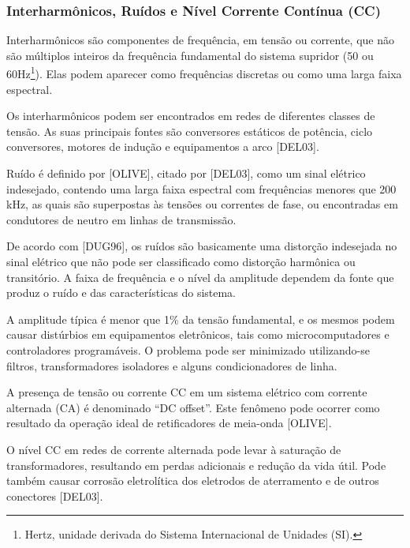 \subsubsection{Interharmônicos, Ruídos e Nível Corrente Contínua (CC)}
\par
Interharmônicos são componentes de frequência, em tensão ou corrente, que não são múltiplos inteiros da frequência fundamental do sistema supridor (50 ou 60Hz\footnote{Hertz, unidade derivada do Sistema Internacional de Unidades (SI).}). Elas podem aparecer como frequências discretas ou como uma larga faixa espectral.
\par
Os interharmônicos podem ser encontrados em redes de diferentes classes de tensão. As suas principais fontes são conversores estáticos de potência, ciclo conversores, motores de indução e equipamentos a arco [DEL03].
\par
Ruído é definido por [OLIVE], citado por [DEL03], como um sinal elétrico indesejado, contendo uma larga faixa espectral com frequências menores que 200 kHz, as quais são superpostas às tensões ou correntes de fase, ou encontradas em condutores de neutro em linhas de transmissão.
\par
De acordo com [DUG96], os ruídos são basicamente uma distorção indesejada no sinal elétrico que não pode ser classificado como distorção harmônica ou transitório. A faixa de frequência e o nível da amplitude dependem da fonte que produz o ruído e das características do sistema. \par
A amplitude típica é menor que 1\% da tensão fundamental, e os mesmos podem causar distúrbios em equipamentos eletrônicos, tais como microcomputadores e controladores programáveis. O problema pode ser minimizado utilizando-se filtros, transformadores isoladores e alguns condicionadores de linha.
\par
A presença de tensão ou corrente CC em um sistema elétrico com corrente alternada (CA) é denominado “DC offset”. Este fenômeno pode ocorrer como resultado da operação ideal de retificadores de meia-onda [OLIVE].
\par
O nível CC em redes de corrente alternada pode levar à saturação de transformadores, resultando em perdas adicionais e redução da vida útil. Pode também causar corrosão eletrolítica dos eletrodos de aterramento e de outros conectores [DEL03].
